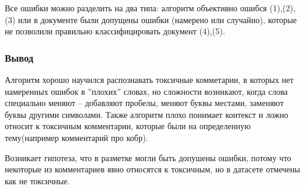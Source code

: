 \documentclass[12pt,fleqn]{article}
\begin{document}
Все ошибки можно разделить на два типа: алгоритм объективно ошибся (1),(2),(3) или в документе
были допущены ошибки (намерено или случайно), которые не позволили правильно 
классифицировать документ (4),(5).

\subsubsection{Вывод}
Алгоритм хорошо научился распознавать токсичные комметарии, в которых нет намеренных ошибок 
в ''плохих'' словах, но сложности возникают, когда слова специально меняют -- добавляют пробелы, меняют
буквы местами, заменяют буквы другими символами. Также алгоритм плохо понимает контекст и ложно относит 
к токсичным комментарии, которые были на определенную тему(например комментарий про кобр).

Возникает гипотеза, что в разметке могли быть допушены ошибки, потому что некоторые из комментариев
явно относятся к токсичным, но в датасете отмечены как не токсичные.
\end{document}
